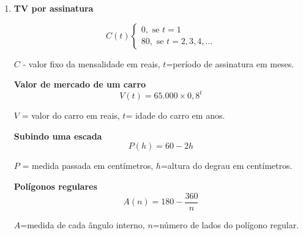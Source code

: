 \documentclass[10 pt,usenames,dvipsnames, oneside]{article}
\begin{document}
\begin{solucao}
\begin{enumerate}
\item \textbf{TV por assinatura}

\[C(t)
\begin{cases}
0,\text{ se } t=1\\
80,\text{ se } t=2,3,4,...
\end{cases}
\]

\begin{center}
$C$ - valor fixo da mensalidade em reais, $t$=período de assinatura em meses.
\end{center}

\textbf{Valor de mercado de um carro}
\begin{equation*}
V(t)=65.000\times 0,8^t
\end{equation*}
\begin{center}
$V$ = valor do carro em reais, $t$= idade do carro em anos.
\end{center}

\textbf{Subindo uma escada}
\begin{equation*}
P(h)=60-2h
\end{equation*}
\begin{center}
$P$ = medida passada em centímetros, $h$=altura do degrau em centímetros.
\end{center}

\textbf{Polígonos regulares}
\begin{equation*}
A(n)=180-\frac{360}{n}
\end{equation*}
\begin{center}
$A$=medida de cada ângulo interno, $n$=número de lados do polígono regular.
\end{center}
\end{enumerate}
\end{solucao}
\fi
\end{document}
